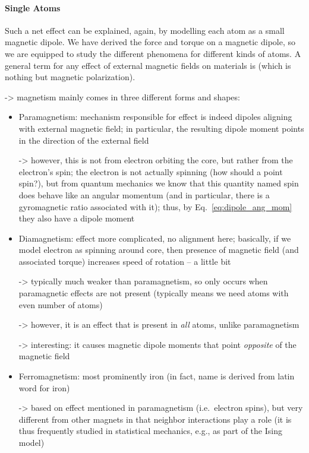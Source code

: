\documentclass[../class_mech_main.tex]{subfiles}
\begin{document}
            \paragraph{Single Atoms}
Such a net effect can be explained, again, by modelling each atom as a small magnetic dipole. We have derived the force and torque on a magnetic dipole, so we are equipped to study the different phenomena for different kinds of atoms. A general term for any effect of external magnetic fields on materials is  (which is nothing but magnetic polarization).


-> magnetism mainly comes in three different forms and shapes:
\begin{itemize}
    \item Paramagnetism: mechanism responsible for effect is indeed dipoles aligning with external magnetic field; in particular, the resulting dipole moment points in the direction of the external field
    
    -> however, this is not from electron orbiting the core, but rather from the electron's spin; the electron is not actually spinning (how should a point spin?), but from quantum mechanics we know that this quantity named spin does behave like an angular momentum (and in particular, there is a gyromagnetic ratio associated with it); thus, by Eq.~\eqref{eq:dipole_ang_mom} they also have a dipole moment
    

    \item Diamagnetism: effect more complicated, no alignment here; basically, if we model electron as spinning around core, then presence of magnetic field (and associated torque) increases speed of rotation -- a little bit
    
    -> typically much weaker than paramagnetism, so only occurs when paramagnetic effects are not present (typically means we need atoms with even number of atoms)

    -> however, it is an effect that is present in \emph{all} atoms, unlike paramagnetism

    -> interesting: it causes magnetic dipole moments that point \emph{opposite} of the magnetic field
    

    \item Ferromagnetism: most prominently iron (in fact, name is derived from latin word for iron)
    
    -> based on effect mentioned in paramagnetism (i.e.~electron spins), but very different from other magnets in that neighbor interactions play a role (it is thus frequently studied in statistical mechanics, e.g., as part of the Ising model)
    

\end{itemize}
\end{document}
